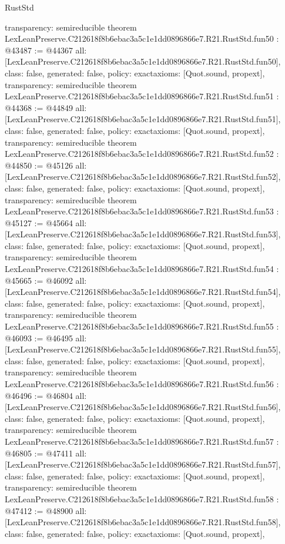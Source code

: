 \begin{lexlean}{RustStd}
\begin{coremodule}
{  transparency: semireducible
}
theorem LexLeanPreserve.C212618f8b6ebac3a5c1e1dd0896866e7.R21.RustStd.fun50 : @43487 := @44367 {
  all: [LexLeanPreserve.C212618f8b6ebac3a5c1e1dd0896866e7.R21.RustStd.fun50],
  class: false,
  generated: false,
  policy: exact{axioms: [Quot.sound, propext]},
  transparency: semireducible
}
theorem LexLeanPreserve.C212618f8b6ebac3a5c1e1dd0896866e7.R21.RustStd.fun51 : @44368 := @44849 {
  all: [LexLeanPreserve.C212618f8b6ebac3a5c1e1dd0896866e7.R21.RustStd.fun51],
  class: false,
  generated: false,
  policy: exact{axioms: [Quot.sound, propext]},
  transparency: semireducible
}
theorem LexLeanPreserve.C212618f8b6ebac3a5c1e1dd0896866e7.R21.RustStd.fun52 : @44850 := @45126 {
  all: [LexLeanPreserve.C212618f8b6ebac3a5c1e1dd0896866e7.R21.RustStd.fun52],
  class: false,
  generated: false,
  policy: exact{axioms: [Quot.sound, propext]},
  transparency: semireducible
}
theorem LexLeanPreserve.C212618f8b6ebac3a5c1e1dd0896866e7.R21.RustStd.fun53 : @45127 := @45664 {
  all: [LexLeanPreserve.C212618f8b6ebac3a5c1e1dd0896866e7.R21.RustStd.fun53],
  class: false,
  generated: false,
  policy: exact{axioms: [Quot.sound, propext]},
  transparency: semireducible
}
theorem LexLeanPreserve.C212618f8b6ebac3a5c1e1dd0896866e7.R21.RustStd.fun54 : @45665 := @46092 {
  all: [LexLeanPreserve.C212618f8b6ebac3a5c1e1dd0896866e7.R21.RustStd.fun54],
  class: false,
  generated: false,
  policy: exact{axioms: [Quot.sound, propext]},
  transparency: semireducible
}
theorem LexLeanPreserve.C212618f8b6ebac3a5c1e1dd0896866e7.R21.RustStd.fun55 : @46093 := @46495 {
  all: [LexLeanPreserve.C212618f8b6ebac3a5c1e1dd0896866e7.R21.RustStd.fun55],
  class: false,
  generated: false,
  policy: exact{axioms: [Quot.sound, propext]},
  transparency: semireducible
}
theorem LexLeanPreserve.C212618f8b6ebac3a5c1e1dd0896866e7.R21.RustStd.fun56 : @46496 := @46804 {
  all: [LexLeanPreserve.C212618f8b6ebac3a5c1e1dd0896866e7.R21.RustStd.fun56],
  class: false,
  generated: false,
  policy: exact{axioms: [Quot.sound, propext]},
  transparency: semireducible
}
theorem LexLeanPreserve.C212618f8b6ebac3a5c1e1dd0896866e7.R21.RustStd.fun57 : @46805 := @47411 {
  all: [LexLeanPreserve.C212618f8b6ebac3a5c1e1dd0896866e7.R21.RustStd.fun57],
  class: false,
  generated: false,
  policy: exact{axioms: [Quot.sound, propext]},
  transparency: semireducible
}
theorem LexLeanPreserve.C212618f8b6ebac3a5c1e1dd0896866e7.R21.RustStd.fun58 : @47412 := @48900 {
  all: [LexLeanPreserve.C212618f8b6ebac3a5c1e1dd0896866e7.R21.RustStd.fun58],
  class: false,
  generated: false,
  policy: exact{axioms: [Quot.sound, propext]},
}
\end{coremodule}
\end{lexlean}
